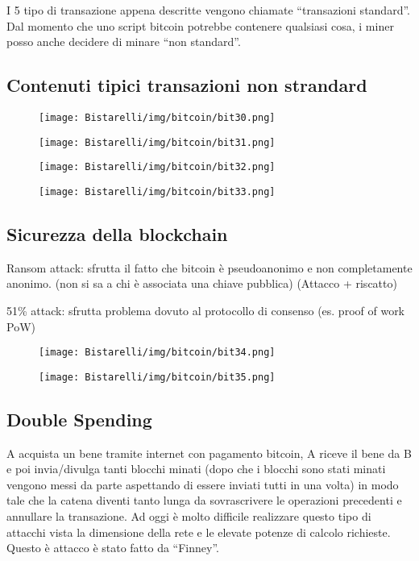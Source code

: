 I 5 tipo di transazione appena descritte vengono chiamate “transazioni standard”. Dal momento che uno script
bitcoin potrebbe contenere qualsiasi cosa, i miner posso anche decidere di minare “non standard”.

\subsection{Contenuti tipici transazioni non strandard}

\begin{figure}[H]
	\centering
    \texttt{[image: Bistarelli/img/bitcoin/bit30.png]}
\end{figure}

\begin{figure}[H]
	\centering
    \texttt{[image: Bistarelli/img/bitcoin/bit31.png]}
\end{figure}

\begin{figure}[H]
	\centering
    \texttt{[image: Bistarelli/img/bitcoin/bit32.png]}
\end{figure}

\begin{figure}[H]
	\centering
    \texttt{[image: Bistarelli/img/bitcoin/bit33.png]}
\end{figure}

\subsection{Sicurezza della blockchain}
Ransom attack: sfrutta il fatto che bitcoin è pseudoanonimo e non completamente anonimo. (non si sa a chi è
associata una chiave pubblica) (Attacco + riscatto)

\singlespacing

51\% attack: sfrutta problema dovuto al protocollo di consenso (es. proof of work PoW)

\begin{figure}[H]
	\centering
    \texttt{[image: Bistarelli/img/bitcoin/bit34.png]}
\end{figure}

\begin{figure}[H]
	\centering
    \texttt{[image: Bistarelli/img/bitcoin/bit35.png]}
\end{figure}

\subsection{Double Spending}
A acquista un bene tramite internet con pagamento bitcoin, A riceve il bene da B e poi invia/divulga tanti blocchi
minati (dopo che i blocchi sono stati minati vengono messi da parte aspettando di essere inviati tutti in una volta)
in modo tale che la catena diventi tanto lunga da sovrascrivere le operazioni precedenti e annullare la transazione.
Ad oggi è molto difficile realizzare questo tipo di attacchi vista la dimensione della rete e le elevate potenze di
calcolo richieste. Questo è attacco è stato fatto da “Finney”.

